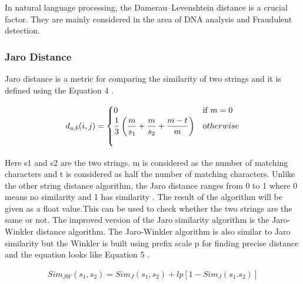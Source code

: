In natural language processing, the Damerau–Levenshtein distance is a crucial factor. They are mainly considered in the area of DNA analysis and Fraudulent detection.
\subsubsection{Jaro Distance}
Jaro distance is a metric for comparing the similarity of two strings and it is defined using the Equation 4 \cite{JaroWinkler}.

\begin{equation}
	\begin{aligned}
		\label{eq:jaro}	
		d_{a,b}(i,j) = 
		\begin{cases}
			0 & \text {if } m = 0\\
			\dfrac{1}{3}\left( \dfrac{m}{s_1} + \dfrac{m}{s_2} + \dfrac{m - t}{m} \right) & \text otherwise\\
			\
		\end{cases}
	\end{aligned}
\end{equation}

Here s1 and s2 are the two strings. m is considered as the number of matching characters and t is considered as half the number of matching characters. Unlike the other string distance algorithm, the Jaro distance ranges from 0 to 1 where 0 means no similarity and 1 has similarity \cite{Ak2021}. The result of the algorithm will be given as a float value.This can be used to check whether the two strings are the same or not. 
The improved version of the Jaro similarity algorithm is the Jaro-Winkler distance algorithm. The Jaro-Winkler algorithm is also similar to Jaro similarity but the Winkler is built using prefix scale p for finding precise distance and the equation looks like Equation 5 \cite{Stat2021}.

\begin{equation}
	\begin{aligned}
		\label{eq:jarowinkler}	
		Sim_{JW}(s_1, s_2) = Sim_J(s_1,s_2) + lp[1 - Sim_J(s_1.s_2)]
	\end{aligned}
\end{equation}
